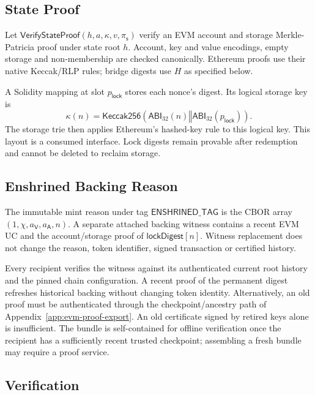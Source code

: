 \subsection{State Proof}

Let $\mathsf{VerifyStateProof}(h,a,\kappa,v,\pi_\mathsf{s})$ verify an EVM account and storage Merkle-Patricia proof under state root $h$. Account, key and value encodings, empty storage and non-membership are checked canonically. Ethereum proofs use their native Keccak/RLP rules; bridge digests use $H$ as specified below.

A Solidity mapping at slot $p_\mathsf{lock}$ stores each nonce's digest. Its logical storage key is
\[
 \kappa(n)=\mathsf{Keccak256}(\mathsf{ABI}_{32}(n)\mathbin\Vert
                                      \mathsf{ABI}_{32}(p_\mathsf{lock})).
\]
The storage trie then applies Ethereum's hashed-key rule to this logical key. This layout is a consumed interface. Lock digests remain provable after redemption and cannot be deleted to reclaim storage.

\subsection{Enshrined Backing Reason}

The immutable mint reason under tag $\mathsf{ENSHRINED\_TAG}$ is the CBOR array $(1,\chi,a_\mathsf{V},a_\mathsf{A},n)$. A separate attached backing witness contains a recent EVM UC and the account/storage proof of $\mathsf{lockDigest}[n]$. Witness replacement does not change the reason, token identifier, signed transaction or certified history.

Every recipient verifies the witness against its authenticated current root history and the pinned chain configuration. A recent proof of the permanent digest refreshes historical backing without changing token identity. Alternatively, an old proof must be authenticated through the checkpoint/ancestry path of Appendix~\ref{app:evm-proof-export}. An old certificate signed by retired keys alone is insufficient. The bundle is self-contained for offline verification once the recipient has a sufficiently recent trusted checkpoint; assembling a fresh bundle may require a proof service.

\subsection{Verification}

